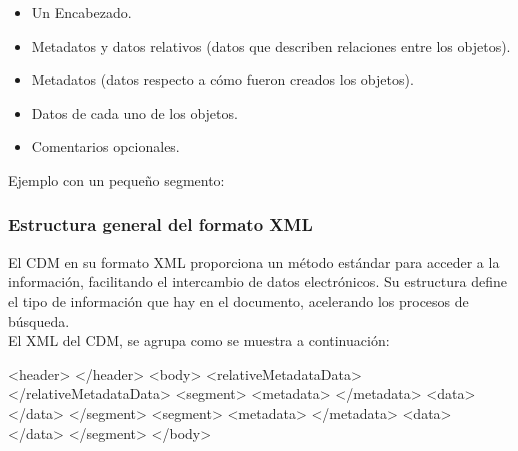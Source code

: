 {\begin{itemize}
\itemsep0em
\item Un Encabezado.
\item Metadatos y datos relativos (datos que describen relaciones entre los objetos).
\item Metadatos (datos respecto a c\'omo fueron creados los objetos).
\item Datos de cada uno de los objetos.
\item Comentarios opcionales.
\end{itemize}

Ejemplo con un peque\~no segmento:\\



\subsubsection*{Estructura general del formato XML}
El CDM en su formato \ac{XML} proporciona un m\'etodo est\'andar para acceder a la informaci\'on, facilitando el intercambio de datos electr\'onicos. Su estructura define el tipo de informaci\'on que hay en el documento, acelerando los procesos de b\'usqueda.\\
El XML del CDM, se agrupa como se muestra a continuaci\'on:

\begin{verbbox}
<header>
</header>
<body>
  <relativeMetadataData>
  </relativeMetadataData>
  <segment>
    <metadata>
    </metadata>
    <data>
    </data>
  </segment>
  <segment>
    <metadata>
    </metadata>
    <data>
    </data>
  </segment>
</body>\\
\end{verbbox}

}
